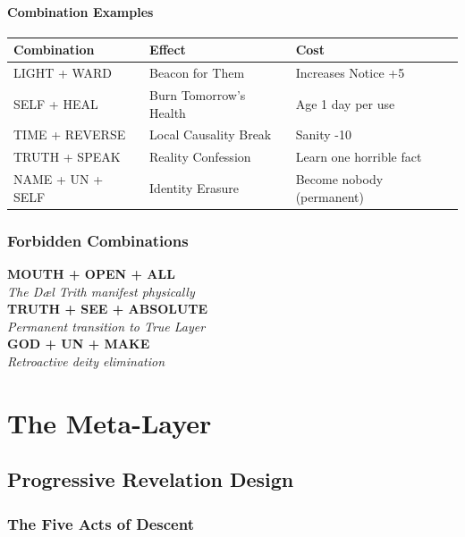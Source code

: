 \documentclass[11pt,a4paper,twoside]{book}
\begin{document}
\subsection{Combination Examples}

\begin{center}
\begin{tabular}{lll}
\textbf{Combination} & \textbf{Effect} & \textbf{Cost} \\
\hline
LIGHT + WARD & Beacon for Them & Increases Notice +5 \\
SELF + HEAL & Burn Tomorrow's Health & Age 1 day per use \\
TIME + REVERSE & Local Causality Break & Sanity -10 \\
TRUTH + SPEAK & Reality Confession & Learn one horrible fact \\
NAME + UN + SELF & Identity Erasure & Become nobody (permanent) \\
\end{tabular}
\end{center}

\section{Forbidden Combinations}

\begin{tcolorbox}[horrorbox={Never Speak These}]
\centering
\textbf{MOUTH + OPEN + ALL}\\
\textit{The Dæl Trith manifest physically}\\
\vspace{0.5em}
\textbf{TRUTH + SEE + ABSOLUTE}\\
\textit{Permanent transition to True Layer}\\
\vspace{0.5em}
\textbf{GOD + UN + MAKE}\\
\textit{Retroactive deity elimination}\\
\end{tcolorbox}

\part{The Meta-Layer}

\chapter{Progressive Revelation Design}

\section{The Five Acts of Descent}
\end{document}
